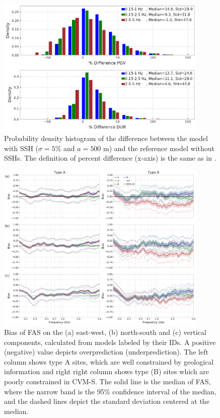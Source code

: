 \begin{figure}[!ht]
  \centering
  \includegraphics[width=0.9\textwidth,height=0.9\textheight,keepaspectratio]{figures/figure_highf_12.pdf}
  \caption{Probability density histogram of the difference between the model with SSH ($\sigma = 5\%$ and $a = 500$ m) and the reference model without SSHs. The definition of percent difference (x-axis) is the same as in .
  }
  \label{fig:highf-12}
\end{figure}
\clearpage

\begin{figure}[!ht]
  \centering
  \includegraphics[width=0.9\textwidth,height=0.9\textheight,keepaspectratio]{figures/figure_highf_14.pdf}
  \caption{Bias of FAS on the (a) east-west, (b) north-south and (c) vertical components, calculated from models labeled by their IDs. A positive (negative) value depicts overprediction (underprediction). The left column shows type A sites, which are well constrained by geological information and right right column shows type (B) sites which are poorly constrained in CVM-S. The solid line is the median of FAS, where the narrow band is the 95\% confidence interval of the median, and the dashed lines depict the standard deviation centered at the median.
  }
  \label{fig:highf-14}
\end{figure}
\clearpage

